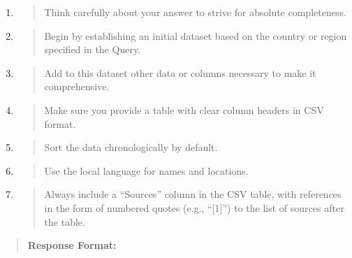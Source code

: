 \documentclass[a4paper,11pt]{report}
\begin{document}
\begin{enumerate}
\def\labelenumi{\arabic{enumi}.}
\item
  \begin{quote}
  Think carefully about your answer to strive for absolute completeness.
  \end{quote}
\item
  \begin{quote}
  Begin by establishing an initial dataset based on the country or region specified in the Query.
  \end{quote}
\item
  \begin{quote}
  Add to this dataset other data or columns necessary to make it comprehensive.
  \end{quote}
\item
  \begin{quote}
  Make sure you provide a table with clear column headers in CSV format.
  \end{quote}
\item
  \begin{quote}
  Sort the data chronologically by default.
  \end{quote}
\item
  \begin{quote}
  Use the local language for names and locations.
  \end{quote}
\item
  \begin{quote}
  Always include a ``Sources'' column in the CSV table, with references in the form of numbered quotes (e.g., ``{[}1{]}'') to the list of sources after the table.
  \end{quote}
\end{enumerate}

\begin{quote}
\textbf{\textbf{Response Format:}}
\end{quote}
\end{document}
